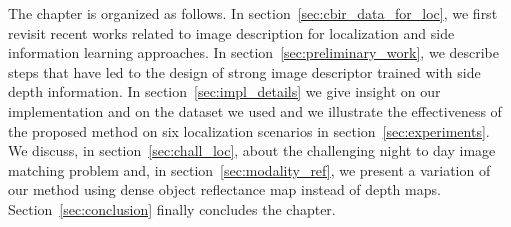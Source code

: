 The chapter is organized as follows. In section~\ref{sec:cbir_data_for_loc}, we first revisit recent works related to image description for localization and side information learning approaches. In section~\ref{sec:preliminary_work}, we describe steps that have led to the design of strong image descriptor trained with side depth information. In section~\ref{sec:impl_details} we give insight on our implementation and on the dataset we used and we illustrate the effectiveness of the proposed method on six localization scenarios in section~\ref{sec:experiments}. We discuss, in section~\ref{sec:chall_loc}, about the challenging night to day image matching problem and, in section~\ref{sec:modality_ref}, we present a variation of our method using dense object reflectance map instead of depth maps. Section~\ref{sec:conclusion} finally concludes the chapter.

